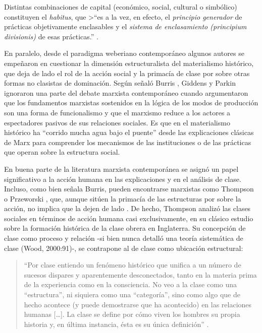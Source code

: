 \documentclass[
]{book}
\begin{document}
Distintas combinaciones de capital (económico, social, cultural o simbólico) constituyen el \emph{habitus}, que
\textgreater{}``es a la vez, en efecto, el \emph{principio generador} de prácticas objetivamente enclasables y el \emph{sistema de enclasamiento (principium divisionis)} de esas prácticas.'' \citep[p.~200]{Bourdieu2012}.

En paralelo, desde el paradigma weberiano contemporáneo algunos autores se empeñaron en cuestionar la dimensión estructuralista del materialismo histórico, que deja de lado el rol de la acción social y la primacía de clase por sobre otras formas no clasistas de dominación. Según señaló Burris \citeyearpar[p.~131]{Burris1995}, Giddens y Parkin ignoraron una parte del debate marxista contemporáneo cuando argumentaron que los fundamentos marxistas sostenidos en la lógica de los modos de producción son una forma de funcionalismo y que el marxismo reduce a los actores a espectadores pasivos de sus relaciones sociales. Es que en el materialismo histórico ha ``corrido mucha agua bajo el puente'' desde las explicaciones clásicas de Marx para comprender los mecanismos de las instituciones o de las prácticas que operan sobre la estructura social.

En buena parte de la literatura marxista contemporánea se asignó un papel significativo a la acción humana en las explicaciones y en el análisis de clase. Incluso, como bien señala Burris, pueden encontrarse marxistas como Thompson \citeyearpar{Thompson1968} o Przeworski \citeyearpar{Przeworski1977}, que, aunque sitúen la primacía de las estructuras por sobre la acción, no implica que la dejen de lado \citep[p.~133]{Burris1995}. De hecho, Thompson analizó las clases sociales en términos de acción humana casi exclusivamente, en su clásico estudio sobre la formación histórica de la clase obrera en Inglaterra. Su concepción de clase como proceso y relación -si bien nunca detalló una teoría sistemática de clase (Wood, 2000:91)-, se contrapone al de clase como ubicación estructural:

\begin{quote}
``Por clase entiendo un fenómeno histórico que unifica a un número de sucesos dispares y aparentemente desconectados, tanto en la materia prima de la experiencia como en la consciencia. No veo a la clase como una ``estructura'', ni siquiera como una ``categoría'', sino como algo que de hecho acontece (y puede demostrarse que ha acontecido) en las relaciones humanas {[}\ldots{]}. La clase se define por cómo viven los hombres su propia historia y, en última instancia, ésta es su única definición'' \citep[pp.~9-11]{Thompson1968}.
\end{quote}
\end{document}
